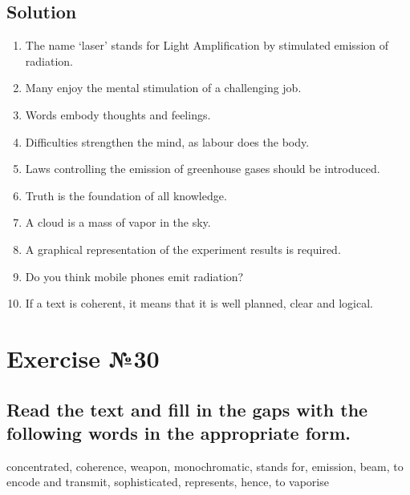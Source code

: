 \subsection*{Solution}
\begin{enumerate}
      \item The name ‘laser’ stands for Light Amplification by stimulated emission of
            radiation.
      \item Many enjoy the mental stimulation of a challenging job.
      \item Words embody thoughts and feelings.
      \item Difficulties strengthen the mind, as labour does the body.
      \item Laws controlling the emission of greenhouse gases should be introduced.
      \item Truth is the foundation of all knowledge.
      \item A cloud is a mass of vapor in the sky.
      \item A graphical representation of the experiment results is required.
      \item Do you think mobile phones emit radiation?
      \item If a text is coherent, it means that it is well planned, clear and logical.
\end{enumerate}

\section*{Exercise №30}
\subsection*{Read the text and fill in the gaps with the following words in the
      appropriate form.}
concentrated, coherence, weapon, monochromatic, stands for, emission, beam, to encode
and transmit, sophisticated, represents, hence, to vaporise


